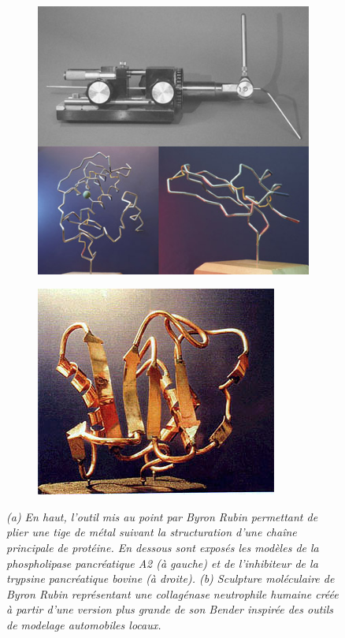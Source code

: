 \begin{figure}
  \begin{subfigure}{.5\textwidth}
  \centering
  {\includegraphics[width=0.9\linewidth]{./figures/ch1/bender_tool_models}}
    \label{Fig:bender_tool_models}
  \caption{}
  \end{subfigure}%
  \begin{subfigure}{.5\textwidth}
  \centering
  {\includegraphics[width=0.9\linewidth]{./figures/ch1/byron_sculpture_colagenase}}    
    \label{Fig:byron_rubin_art}
  \caption{}
  \hspace{0.3cm}
  \end{subfigure}%
 \caption{\it (a) En haut, l'outil mis au point par Byron Rubin permettant de plier une tige de métal suivant la structuration d'une chaîne principale de protéine. En dessous sont exposés les modèles de la phospholipase pancréatique A2 (à gauche) et de l'inhibiteur de la trypsine pancréatique bovine (à droite).
  (b) Sculpture moléculaire de Byron Rubin représentant une collagénase neutrophile humaine créée à partir d'une version plus grande de son Bender inspirée des outils de modelage automobiles locaux.}
\end{figure}

